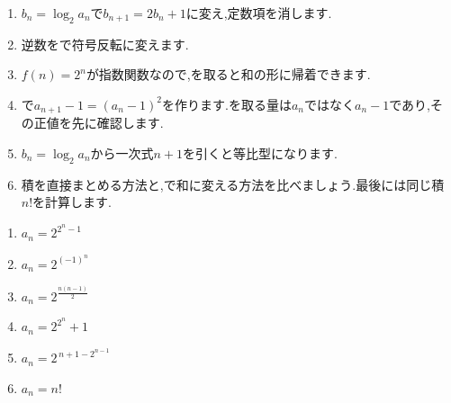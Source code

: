   \noindent{}\par\nobreak
  \begin{enumerate}[label=(\arabic*),parsep=3pt,format=\bookitemlink{example-logarithmic-1}{hint}{problem}]
    \item $b_n=\log_2a_n$で$b_{n+1}=2b_n+1$に変え,定数項を消します.
    \item 逆数をで符号反転に変えます.
    \item $f(n)=2^n$が指数関数なので,を取ると和の形に帰着できます.
    \item {}で$a_{n+1}-1=(a_n-1)^2$を作ります.を取る量は$a_n$ではなく$a_n-1$であり,その正値を先に確認します.
    \item $b_n=\log_2a_n$から一次式$n+1$を引くと等比型になります.
    \item 積を直接まとめる方法と,で和に変える方法を比べましょう.最後には同じ積$n!$を計算します.
  \end{enumerate}

  \noindent{}\par\nobreak
  \begin{enumerate}[label=(\arabic*),parsep=3pt,format=\bookitemlink{example-logarithmic-1}{answer}{problem}]
    \item $\displaystyle a_n=2^{2^{n}-1}$
    \item $a_n=2^{(-1)^{n}}$
    \item $a_n=2^{\frac{n(n-1)}{2}}$
    \item $a_n=2^{2^n}+1$
    \item $\displaystyle a_n=2^{\,n+1-2^{n-1}}$
    \item $a_n=n!$
  \end{enumerate}

  \noindent{}\par\nobreak

